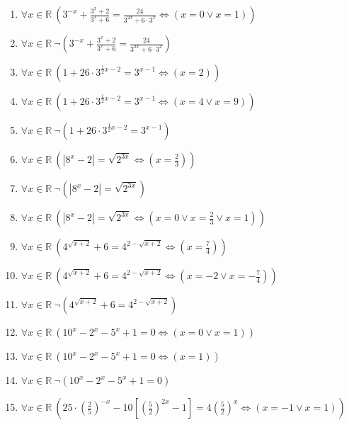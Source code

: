 \documentclass[11pt,a4paper]{article}
\begin{document}
\begin{enumerate}
\item $\displaystyle \forall x \in \mathbb{R}\ \left( 3^{-x} + \frac{3^{x} + 2}{3^{x} + 6} = \frac{24}{3^{2x} + 6 \cdot 3^{x}} \iff \left( x = 0 \lor x = 1 \right) \right)$
\item $\displaystyle \forall x \in \mathbb{R}\ \lnot \left( 3^{-x} + \frac{3^{x} + 2}{3^{x} + 6} = \frac{24}{3^{2x} + 6 \cdot 3^{x}} \right)$
\item $\displaystyle \forall x \in \mathbb{R}\ \left( 1 + 26 \cdot 3^{\frac{1}{2}x - 2} = 3^{x-1} \iff \left( x = 2 \right) \right)$
\item $\displaystyle \forall x \in \mathbb{R}\ \left( 1 + 26 \cdot 3^{\frac{1}{2}x - 2} = 3^{x-1} \iff \left( x = 4 \lor x = 9 \right) \right)$
\item $\displaystyle \forall x \in \mathbb{R}\ \lnot \left( 1 + 26 \cdot 3^{\frac{1}{2}x - 2} = 3^{x-1} \right)$
\item $\displaystyle \forall x \in \mathbb{R}\ \left( \left| 8^{x} - 2 \right| = \sqrt{2^{3x}} \iff \left( x = \frac{2}{3} \right) \right)$
\item $\displaystyle \forall x \in \mathbb{R}\ \lnot \left( \left| 8^{x} - 2 \right| = \sqrt{2^{3x}} \right)$
\item $\displaystyle \forall x \in \mathbb{R}\ \left( \left| 8^{x} - 2 \right| = \sqrt{2^{3x}} \iff \left( x = 0 \lor x = \frac{2}{3} \lor x = 1 \right) \right)$
\item $\displaystyle \forall x \in \mathbb{R}\ \left( 4^{\sqrt{x+2}} + 6 = 4^{2 - \sqrt{x+2}} \iff \left( x = \frac{7}{4} \right) \right)$
\item $\displaystyle \forall x \in \mathbb{R}\ \left( 4^{\sqrt{x+2}} + 6 = 4^{2 - \sqrt{x+2}} \iff \left( x = -2 \lor x = -\frac{7}{4} \right) \right)$
\item $\displaystyle \forall x \in \mathbb{R}\ \lnot \left( 4^{\sqrt{x+2}} + 6 = 4^{2 - \sqrt{x+2}} \right)$
\item $\displaystyle \forall x \in \mathbb{R}\ \left( 10^{x} - 2^{x} - 5^{x} + 1 = 0 \iff \left( x = 0 \lor x = 1 \right) \right)$
\item $\displaystyle \forall x \in \mathbb{R}\ \left( 10^{x} - 2^{x} - 5^{x} + 1 = 0 \iff \left( x = 1 \right) \right)$
\item $\displaystyle \forall x \in \mathbb{R}\ \lnot \left( 10^{x} - 2^{x} - 5^{x} + 1 = 0 \right)$
\item $\displaystyle \forall x \in \mathbb{R}\ \left( 25 \cdot \left(\frac{2}{5}\right)^{-x} - 10\left[\left(\frac{5}{2}\right)^{2x} - 1\right] = 4\left(\frac{5}{2}\right)^{x} \iff \left( x = -1 \lor x = 1 \right) \right)$

\end{enumerate}
\end{document}
